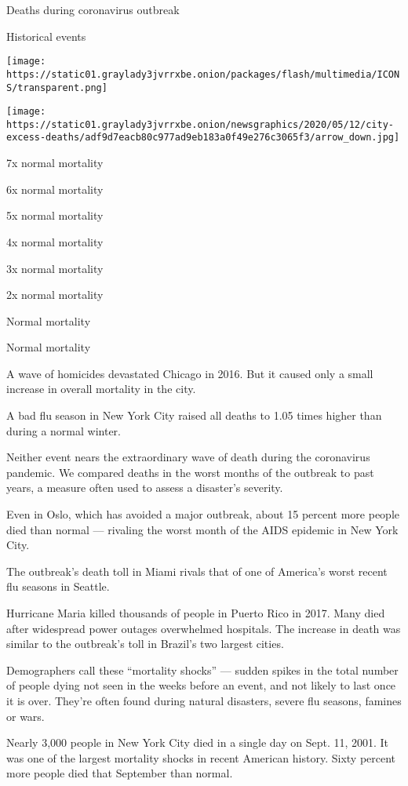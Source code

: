 Deaths during coronavirus outbreak

Historical events

\texttt{[image: https://static01.graylady3jvrrxbe.onion/packages/flash/multimedia/ICONS/transparent.png]}

\texttt{[image: https://static01.graylady3jvrrxbe.onion/newsgraphics/2020/05/12/city-excess-deaths/adf9d7eacb80c977ad9eb183a0f49e276c3065f3/arrow\_down.jpg]}

7x normal mortality

6x normal mortality

5x normal mortality

4x normal mortality

3x normal mortality

2x normal mortality

Normal mortality

Normal mortality

A wave of homicides devastated Chicago in 2016. But it caused only a
small increase in overall mortality in the city.

A bad flu season in New York City raised all deaths to 1.05 times higher
than during a normal winter.

Neither event nears the extraordinary wave of death during the
coronavirus pandemic. We compared deaths in the worst months of the
outbreak to past years, a measure often used to assess a disaster's
severity.

Even in Oslo, which has avoided a major outbreak, about 15 percent more
people died than normal --- rivaling the worst month of the AIDS
epidemic in New York City.

The outbreak's death toll in Miami rivals that of one of America's worst
recent flu seasons in Seattle.

Hurricane Maria killed thousands of people in Puerto Rico in 2017. Many
died after widespread power outages overwhelmed hospitals. The increase
in death was similar to the outbreak's toll in Brazil's two largest
cities.

Demographers call these ``mortality shocks'' --- sudden spikes in the
total number of people dying not seen in the weeks before an event, and
not likely to last once it is over. They're often found during natural
disasters, severe flu seasons, famines or wars.

Nearly 3,000 people in New York City died in a single day on Sept. 11,
2001. It was one of the largest mortality shocks in recent American
history. Sixty percent more people died that September than normal.


